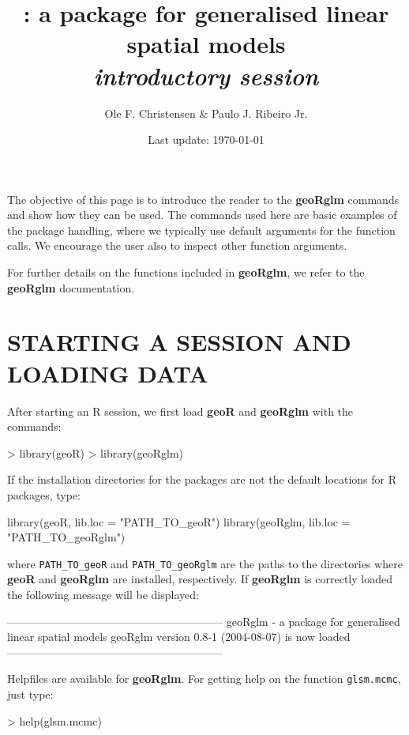 \documentclass[12pt,a4paper]{article}
\title{\pkg{geoRglm} : a package for  generalised linear spatial models
\\{\it introductory session}}
\author{Ole F. Christensen \& Paulo J. Ribeiro Jr.}
\date{Last update: \today}
\newcommand{\strong}[1]{{\textbf{ #1}}}
\let\pkg=\strong
\newcommand{\code}[1]{\texttt{\small #1}}
\newcommand{\R}{{\textsf{R}}{}}
\begin{document}
\maketitle




The objective of this page is to introduce the reader to the 
\pkg{geoRglm} commands and show how they can be used.
The commands used here are basic examples of the package handling, where we typically use default arguments for the function calls.
We encourage the user also to inspect other function arguments.

For further details on the functions included in \pkg{geoRglm}, we refer to the \pkg{geoRglm} documentation.

\section{STARTING A SESSION AND LOADING DATA}
After starting an \R{} session, we first load \pkg{geoR} and \pkg{geoRglm} with the commands:
\begin{Schunk}
\begin{Sinput}
> library(geoR)
> library(geoRglm)
\end{Sinput}
\end{Schunk}

If the installation directories for the packages are not the default locations for \R{} packages, type:
\begin{Rin}
  library(geoR, lib.loc = "PATH_TO_geoR")
  library(geoRglm, lib.loc = "PATH_TO_geoRglm")
\end{Rin}
where \verb+PATH_TO_geoR+ and \verb+PATH_TO_geoRglm+ are the paths to the directories where \pkg{geoR} and \pkg{geoRglm} are installed, respectively.
If \pkg{geoRglm} is correctly loaded the following message will be displayed:
\begin{Schunk}
\begin{Soutput}
-----------------------------------------------------------
geoRglm - a package for generalised linear spatial models
geoRglm version 0.8-1 (2004-08-07) is now loaded
-----------------------------------------------------------
\end{Soutput}
\end{Schunk}
Helpfiles are available for \pkg{geoRglm}. For getting help on the function \code{glsm.mcmc}, just type:  
\begin{Rin}
> help(glsm.mcmc)
\end{Rin}
\end{document}

